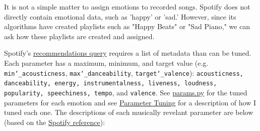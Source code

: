 \documentclass{article}
\renewcommand{\_}[1]{\underline{ #1 }}
\theoremstyle{definition}
\begin{document}
It is not a simple matter to assign emotions to recorded songs. Spotify does not directly contain emotional data, such as 'happy' or 'sad.' However, since its algorithms have created playlists such as "Happy Beats" or "Sad Piano," we can ask how these playlists are created and assigned. 

Spotify's \href{https://developer.spotify.com/documentation/web-api/reference/#/operations/get-recommendationsrecommendation}{recommendations query} requires a list of metadata than can be tuned. Each parameter has a maximum, minimum, and target value (e.g. \texttt{min\char`_acousticness}, \texttt{max\char`_danceability}, \texttt{target\char`_valence}): \texttt{acousticness, danceability, energy, instrumentalness, liveness, loudness, popularity, speechiness, tempo}, and \texttt{valence}. See \href{https://github.com/as4mo3/face-the-music/blob/master/params.py}{params.py} for the tuned parameters for each emotion and see \hyperref[Parameter Tuning]{Parameter Tuning} for a description of how I tuned each one. The descriptions of each musically revelant parameter are below (based on the \href{https://developer.spotify.com/documentation/web-api/reference/#/operations/get-audio-features}{Spotify reference}):
\end{document}
